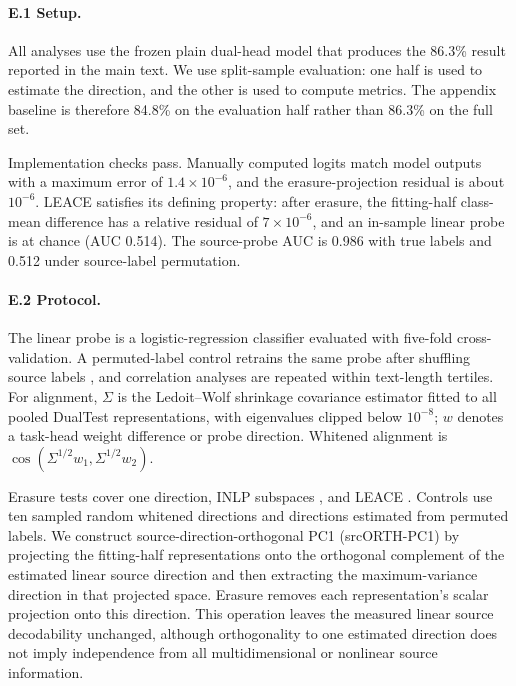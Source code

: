\paragraph{E.1 Setup.} All analyses use the frozen plain dual-head model that produces the 86.3\% result reported in the main text. We use split-sample evaluation: one half is used to estimate the direction, and the other is used to compute metrics. The appendix baseline is therefore 84.8\% on the evaluation half rather than 86.3\% on the full set.

Implementation checks pass. Manually computed logits match model outputs with a maximum error of $1.4 \times 10^{-6}$, and the erasure-projection residual is about $10^{-6}$. LEACE satisfies its defining property: after erasure, the fitting-half class-mean difference has a relative residual of $7 \times 10^{-6}$, and an in-sample linear probe is at chance (AUC 0.514). The source-probe AUC is 0.986 with true labels and 0.512 under source-label permutation.

\paragraph{E.2 Protocol.} The linear probe is a logistic-regression classifier evaluated with five-fold cross-validation. A permuted-label control retrains the same probe after shuffling source labels \citep{hewitt2019probes}, and correlation analyses are repeated within text-length tertiles. For alignment, $\Sigma$ is the Ledoit--Wolf shrinkage covariance estimator \citep{ledoit2004covariance} fitted to all pooled DualTest representations, with eigenvalues clipped below $10^{-8}$; $w$ denotes a task-head weight difference or probe direction. Whitened alignment is $\cos(\Sigma^{1/2}w_1,\Sigma^{1/2}w_2)$.

Erasure tests cover one direction, INLP subspaces \citep[$k = 1$--$16$;][]{ravfogel2020inlp}, and LEACE \citep{belrose2023leace}. Controls use ten sampled random whitened directions and directions estimated from permuted labels. We construct source-direction-orthogonal PC1 (srcORTH-PC1) by projecting the fitting-half representations onto the orthogonal complement of the estimated linear source direction and then extracting the maximum-variance direction in that projected space. Erasure removes each representation's scalar projection onto this direction. This operation leaves the measured linear source decodability unchanged, although orthogonality to one estimated direction does not imply independence from all multidimensional or nonlinear source information.

